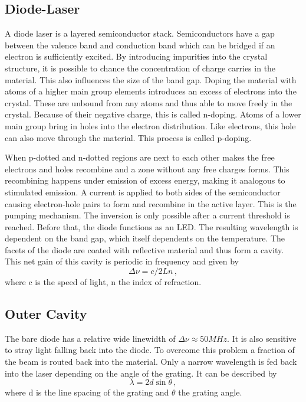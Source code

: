 \subsection{Diode-Laser}

A diode laser is a layered semiconductor stack. 
Semiconductors have a gap between the valence band and conduction band which can be bridged if an electron is sufficiently excited.
By introducing impurities into the crystal structure, it is possible to chance the concentration of charge carries in the material. This also influences the size of the band gap.
Doping the material with atoms of a higher main group elements introduces an excess of electrons into the crystal. These are unbound from any atoms and thus able to move freely in the crystal.
Because of their negative charge, this is called n-doping.
Atoms of a lower main group bring in holes into the electron distribution. Like electrons, this hole can also move through the material.
This process is called p-doping.

When p-dotted and n-dotted regions are next to each other makes the free electrons and holes recombine and a zone without any free charges forms.
This recombining happens under emission of excess energy, making it analogous to stimulated emission.
A current is applied to both sides of the semiconductor causing electron-hole pairs to form and recombine in the active layer. This is the pumping mechanism.
The inversion is only possible after a current threshold is reached. Before that, the diode functions as an LED.
The resulting wavelength is dependent on the band gap, which itself dependents on the temperature. 
The facets of the diode are coated with reflective material and thus form a cavity.
This net gain of this cavity is periodic in frequency and given by
\begin{equation}
    \Delta \nu = c/2Ln \, , 
\end{equation}
where c is the speed of light, n the index of refraction.

\subsection{Outer Cavity}

The bare diode has a relative wide linewidth of $\Delta \nu \approx 50 MHz$. It is also sensitive to stray light falling back into the diode. 
To overcome this problem a fraction of the beam is routed back into the material. 
Only a narrow wavelength is fed back into the laser depending on the angle of the grating. 
It can be described by
\begin{equation}
    \lambda = 2 d \sin \theta \,,
\end{equation}
where d is the line spacing of the grating and $\theta$ the grating angle.


